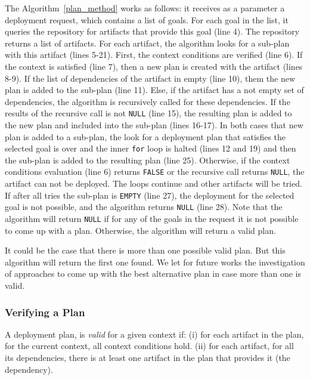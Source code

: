 The Algorithm~\ref{plan_method} works as follows: it receives as a parameter a deployment request, which contains a list of goals. For each goal in the list, it queries the repository for artifacts that provide this goal (line 4). The repository returns a list of artifacts. For each artifact, the algorithm looks for a sub-plan with this artifact (lines 5-21). First, the context conditions are verified (line 6). If the context is satisfied (line 7),
then a new plan is created with the artifact (lines 8-9). If the list of dependencies of the artifact in empty (line 10), them the new plan is added to the sub-plan (line 11). Else, if the artifact has a not empty set of dependencies, the algorithm is recursively called for these dependencies. If the results of the recursive call is not \texttt{NULL} (line 15), the resulting plan is added to the new plan and included into the sub-plan (lines 16-17).
In both cases that new plan is added to a sub-plan, the look for a deployment plan that satisfies the selected goal is over and the inner \texttt{for} loop is halted (lines 12 and 19) and then the sub-plan is added to the resulting plan (line 25).
Otherwise, if the context conditions evaluation (line 6) returns \texttt{FALSE} or the recursive call returns \texttt{NULL}, the artifact can not be deployed. The loops continue and other artifacts will be tried. If after all tries the sub-plan is \texttt{EMPTY} (line 27), the deployment for the selected goal is not possible, and the algorithm returns \texttt{NULL} (line 28). Note that the algorithm will return \texttt{NULL} if for any of the goals in the request it is not possible to come up with a plan. Otherwise, the algorithm will return a valid plan.

It could be the case that there is more than one possible valid plan. But this algorithm will return the first one found.  We let for future works the investigation of approaches to come up with the best alternative plan in case more than one is valid.

\subsubsection{Verifying a Plan}
\label{verify_plan}

A deployment plan, is \emph{valid} for a given context if: (i) for each artifact in the plan, for the current context, all context conditions hold.
(ii) for each artifact, for all its dependencies, there is at least one artifact in the plan that provides it (the dependency).


